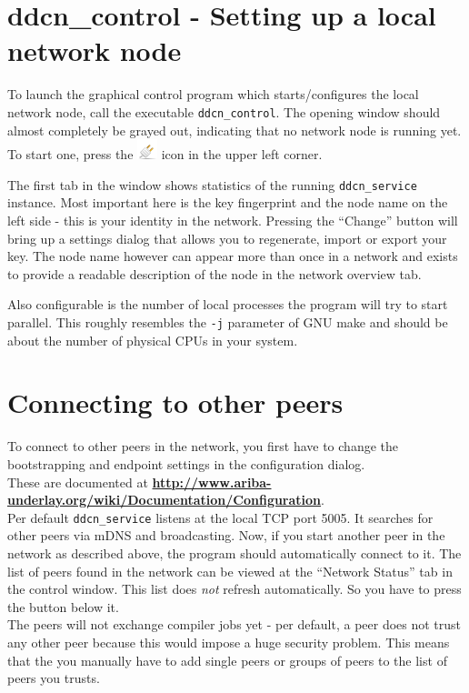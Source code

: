 \documentclass[a4paper,9pt]{scrartcl}
\begin{document}
\section{ddcn\_control - Setting up a local network node}

To launch the graphical control program which starts/configures the local network node, call the executable \texttt{ddcn\_control}. The opening window should almost completely be grayed out, indicating that no network node is running yet. To start one, press the 
\includegraphics[scale=0.1,keepaspectratio=true]{../ddcn_control/icons/network-disconnect.png} icon in the upper left corner.\\
\smallskip

The first tab in the window shows statistics of the running \texttt{ddcn\_service} instance. Most important here is the key fingerprint and the node name on the left side - this is your identity in the network. Pressing the ``Change'' button will bring up a settings dialog that allows you to regenerate, import or export your key. The node name however can appear more than once in a network and exists to provide a readable description of the node in the network overview tab.\\
\smallskip

Also configurable is the number of local processes the program will try to start parallel. This roughly resembles the \texttt{-j} parameter of GNU make and should be about the number of physical CPUs in your system.

\section{Connecting to other peers}

To connect to other peers in the network, you first have to change the bootstrapping and endpoint settings in the configuration dialog.\\These are documented at \textbf{\url{http://www.ariba-underlay.org/wiki/Documentation/Configuration}}.\\Per default \texttt{ddcn\_service} listens at the local TCP port 5005. It searches for other peers via mDNS and broadcasting. Now, if you start another peer in the network as described above, the program should automatically connect to it. The list of peers found in the network can be viewed at the ``Network Status'' tab in the control window. This list does \textit{not} refresh automatically. So you have to press the button below it.\\
The peers will not exchange compiler jobs yet - per default, a peer does not trust any other peer because this would impose a huge security problem. This means that the you manually have to add single peers or groups of peers to the list of peers you trusts.
\end{document}

